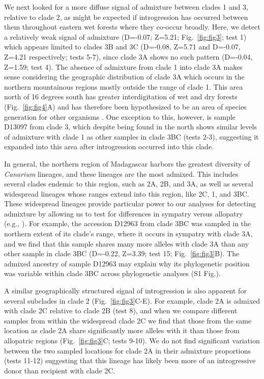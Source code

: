 \documentclass[10pt,letterpaper]{article}
\begin{document}
We next looked for a more diffuse signal of admixture between clades 1 and 3, relative to clade 2, as might be expected if introgression has occurred between them throughout eastern wet forests where they co-occur broadly. Here, we detect a relatively weak signal of admixture (D=-0.07; Z=5.21; Fig.~\ref{fig:fig3}; test 1) which appears limited to clades 3B and 3C (D=-0.08, Z=5.71 and D=-0.07, Z=4.21 respectively; tests 5-7), since clade 3A shows no such pattern (D=-0.04, Z=1.59; test 4). The absence of admixture from clade 1 into clade 3A makes sense considering the geographic distribution of clade 3A which occurs in the northern mountainous regions mostly outside the range of clade 1. This area north of 16 degrees south has greater interdigitation of wet and dry forests (Fig.~\ref{fig:fig4}A) and has therefore been hypothesized to be an area of species generation for other organisms \cite{vences_madagascar_2009}. One exception to this, however, is sample D13097 from clade 3, which despite being found in the north shows similar levels of admixture with clade 1 as other samples in clade 3BC (tests 2-3), suggesting it expanded into this area after introgression occurred into this clade. 

In general, the northern region of Madagascar harbors the greatest diversity of \emph{Canarium} lineages, and these lineages are the most admixed. This includes several clades endemic to this region, such as 2A, 2B, and 3A, as well as several widespread lineages whose ranges extend into this region, like 2C, 1, and 3BC. These widespread lineages provide particular power to our analyses for detecting admixture by allowing us to test for differences in sympatry versus allopatry (e.g., \cite{eaton_historical_2015}). For example, the accession D12963 from clade 3BC was sampled in the northern extent of its clade's range, where it occurs in sympatry with clade 3A, and we find that this sample shares many more alleles with clade 3A than any other sample in clade 3BC (D=-0.22, Z=3.39; test 15; Fig.~\ref{fig:fig3}B). The admixed ancestry of sample D12963 may explain why its phylogenetic position was variable within clade 3BC across phylogenetic analyses (S1 Fig.).%

A similar geographically structured signal of introgression is also apparent for several subclades in clade 2 (Fig.~\ref{fig:fig3}C-E). For example, clade 2A is admixed with clade 2C relative to clade 2B (test 8), and when we compare different samples from within the widespread clade 2C we find that those from the same location as clade 2A share significantly more alleles with it than those from allopatric regions (Fig.~\ref{fig:fig3}C; tests 9-10). We do not find significant variation between the two sampled locations for clade 2A in their admixture proportions (tests 11-12) suggesting that this lineage has likely been more of an introgressive donor than recipient with clade 2C.
\end{document}
